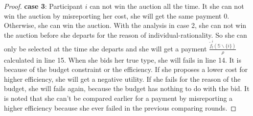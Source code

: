 \documentclass[10pt,journal,letterpaper,compsoc]{IEEEtran}
\begin{document}
\begin{proof}
\textbf{case 3}: Participant $i$ can not win the auction all the time. It she can not win the auction by misreporting her cost, she will get the same payment 0. Otherwise, she can win the auction. With the analysis in case 2, she can not win the auction before she departs for the reason of individual-rationality. So she can only be selected at the time she departs and she will get a payment $\frac{\tilde{f}^{i}_t(\mathbb{S}\backslash\{{i}\})}{\rho}$ calculated in line 15. When she bids her true type, she will fails in line 14. It is because of the budget constraint or the efficiency. If she proposes a lower cost for higher efficiency, she will get a negative utility. If she fails for the reason of the budget, she will fails again, because the budget has nothing to do with the bid. It is noted that she can't be compared earlier for a payment by misreporting a higher efficiency because she ever failed in the previous comparing rounds.
\end{proof}
\end{document}

